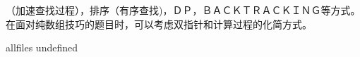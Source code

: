 \documentclass[a4paper,10pt]{article}
\begin{document}
\begin{CJK}{UTF8}{gbsn}     %

\else

（加速查找过程），排序（有序查找)，ＤＰ，ＢＡＣＫＴＲＡＣＫＩＮＧ等方式。在面对纯数组技巧的题目时，可以考虑双指针和计算过程的化简方式。\\

\fi

\ifx allfiles undefined
\end{CJK}
\end{document}
